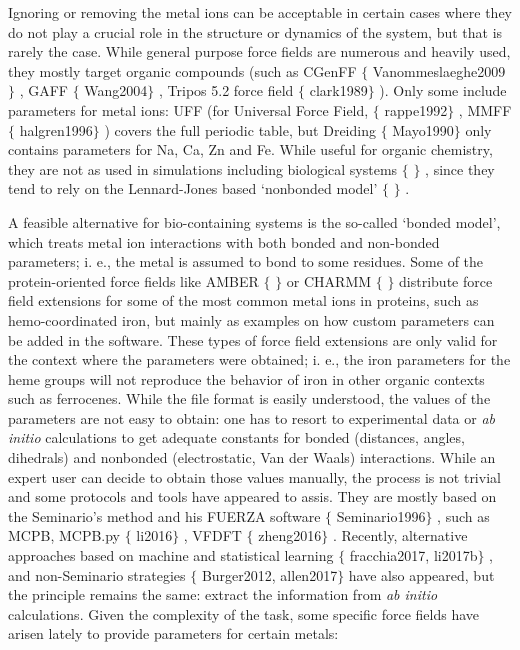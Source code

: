 Ignoring or removing the metal ions can be acceptable in certain cases where they do not play a crucial role in the structure or dynamics of the system, but that is rarely the case. While general purpose force fields are numerous and heavily used, they mostly target organic compounds (such as CGenFF $ \{ $ Vanommeslaeghe2009$ \} $ , GAFF $ \{ $ Wang2004$ \} $ , Tripos 5.2 force field $ \{ $ clark1989$ \} $ ). Only some include parameters for metal ions: UFF (for Universal Force Field, $ \{ $ rappe1992$ \} $ , MMFF $ \{ $ halgren1996$ \} $ ) covers the full periodic table, but Dreiding $ \{ $ Mayo1990$ \} $  only contains parameters for Na, Ca, Zn and Fe. While useful for organic chemistry, they are not as used in simulations including biological systems $ \{ $ $ \} $ , since they tend to rely on the Lennard-Jones based ‘nonbonded model’ $ \{ $ $ \} $ .

A feasible alternative for bio-containing systems is the so-called ‘bonded model’, which treats metal ion interactions with both bonded and non-bonded parameters; i. e., the metal is assumed to bond to some residues. Some of the protein-oriented force fields like AMBER $ \{ $ $ \} $  or CHARMM $ \{ $ $ \} $  distribute force field extensions for some of the most common metal ions in proteins, such as hemo-coordinated iron, but mainly as examples on how custom parameters can be added in the software. These types of force field extensions are only valid for the context where the parameters were obtained; i. e., the iron parameters for the heme groups will not reproduce the behavior of iron in other organic contexts such as ferrocenes. While the file format is easily understood, the values of the parameters are not easy to obtain: one has to resort to experimental data or \textit{ab initio} calculations to get adequate constants for bonded (distances, angles, dihedrals) and nonbonded (electrostatic, Van der Waals) interactions. While an expert user can decide to obtain those values manually, the process is not trivial and some protocols and tools have appeared to assis. They are mostly based on the Seminario’s method and his FUERZA software $ \{ $ Seminario1996$ \} $ , such as MCPB, MCPB.py $ \{ $ li2016$ \} $ , VFDFT $ \{ $ zheng2016$ \} $ . Recently, alternative approaches based on machine and statistical learning $ \{ $ fracchia2017, li2017b$ \} $ , and non-Seminario strategies $ \{ $ Burger2012, allen2017$ \} $  have also appeared, but the principle remains the same: extract the information from \textit{ab initio} calculations. Given the complexity of the task, some specific force fields have arisen lately to provide parameters for certain metals:

